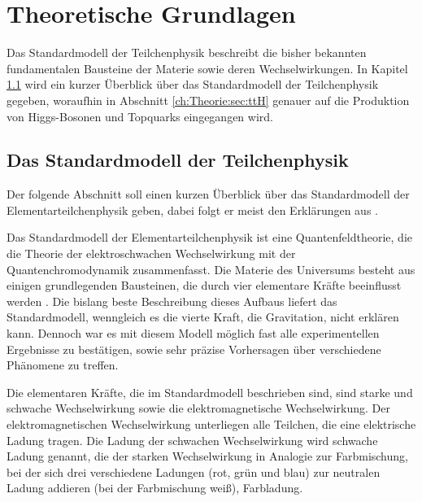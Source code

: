 \chapter{Theoretische Grundlagen}
\label{ch:Theorie}

{}	%

Das Standardmodell der Teilchenphysik beschreibt die bisher bekannten fundamentalen Bausteine der Materie sowie deren Wechselwirkungen. In Kapitel \ref{ch:Theorie:sec:Standardmodell} wird ein kurzer \"Uberblick \"uber das Standardmodell der Teilchenphysik gegeben, woraufhin in Abschnitt \ref{ch:Theorie:sec:ttH} genauer auf die Produktion von Higgs-Bosonen und Topquarks eingegangen wird.\\


\section{Das Standardmodell der Teilchenphysik}
\label{ch:Theorie:sec:Standardmodell}

Der folgende Abschnitt soll einen kurzen \"Uberblick \"uber das Standardmodell der Elementarteilchenphysik geben, dabei folgt er meist den Erkl\"arungen aus \cite{SWB-39819646X}.

Das Standardmodell der Elementarteilchenphysik ist eine Quantenfeldtheorie, die die Theorie der elektroschwachen Wechselwirkung mit der Quantenchromodynamik zusammenfasst. Die Materie des Universums besteht aus einigen grundlegenden Bausteinen, die durch vier elementare Kr\"afte beeinflusst werden \cite{O'Luanaigh:1997201}. Die bislang beste Beschreibung dieses Aufbaus liefert das Standardmodell, wenngleich es die vierte Kraft, die Gravitation, nicht erkl\"aren kann. Dennoch war es mit diesem Modell m\"oglich fast alle experimentellen Ergebnisse zu best\"atigen, sowie sehr pr\"azise Vorhersagen \"uber verschiedene Ph\"anomene zu treffen.

Die elementaren Kr\"afte, die im Standardmodell beschrieben sind, sind starke und schwache Wechselwirkung sowie die elektromagnetische Wechselwirkung. Der elektromagnetischen Wechselwirkung unterliegen alle Teilchen, die eine elektrische Ladung tragen. Die Ladung der schwachen Wechselwirkung wird schwache Ladung genannt, die der starken Wechselwirkung in Analogie zur Farbmischung, bei der sich drei verschiedene Ladungen (rot, gr\"un und blau) zur neutralen Ladung addieren (bei der Farbmischung wei\ss), Farbladung.

